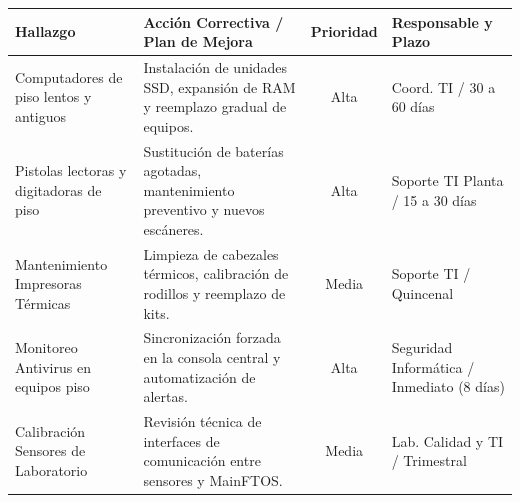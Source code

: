 		\vspace{0.5cm}
		\noindent
		\begin{tabularx}{\textwidth}{|p{3.5cm}|X|c|p{3.5cm}|}
		\hline
		\textbf{Hallazgo} & \textbf{Acción Correctiva / Plan de Mejora} & \textbf{Prioridad} & \textbf{Responsable y Plazo} \\ \hline
		Computadores de piso lentos y antiguos & Instalación de unidades SSD, expansión de RAM y reemplazo gradual de equipos. & Alta & Coord. TI / 30 a 60 días \\ \hline
		Pistolas lectoras y digitadoras de piso & Sustitución de baterías agotadas, mantenimiento preventivo y nuevos escáneres. & Alta & Soporte TI Planta / 15 a 30 días \\ \hline
		Mantenimiento Impresoras Térmicas & Limpieza de cabezales térmicos, calibración de rodillos y reemplazo de kits. & Media & Soporte TI / Quincenal \\ \hline
		Monitoreo Antivirus en equipos piso & Sincronización forzada en la consola central y automatización de alertas. & Alta & Seguridad Informática / Inmediato (8 días) \\ \hline
		Calibración Sensores de Laboratorio & Revisión técnica de interfaces de comunicación entre sensores y MainFTOS. & Media & Lab. Calidad y TI / Trimestral \\ \hline
		\end{tabularx}
		\vspace{0.5cm}
		
